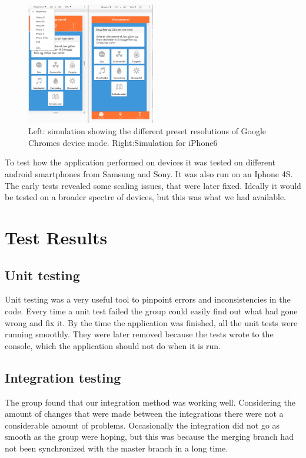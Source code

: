 \begin{figure}[H]\label{ref:chrome_dev}
\centering
    \includegraphics[width=0.5\textwidth]{images/chrome_device.png}
    \caption{Left: simulation showing the different preset resolutions of Google Chromes device mode. Right:Simulation for iPhone6}
    \label{fig:chrome_dev}
\end{figure}
To test how the application performed on devices it was tested on different android smartphones from Samsung and Sony. It was also run on an Iphone 4S. The early tests revealed some scaling issues, that were later fixed. Ideally it would be tested on a broader spectre of devices, but this was what we had available.

\section{Test Results}

\subsection{Unit testing}
Unit testing was a very useful tool to pinpoint errors and inconsistencies in the code. Every time a unit test failed the group could easily find out what had gone wrong and fix it. By the time the application was finished, all the unit tests were running smoothly. They were later removed because the tests wrote to the console, which the application should not do when it is run.

\subsection{Integration testing}
The group found that our integration method was working well. Considering the amount of changes that were made between the integrations there were not a considerable amount of problems. Occasionally the integration did not go as smooth as the group were hoping, but this was because the merging branch had not been synchronized with the master branch in a long time.

